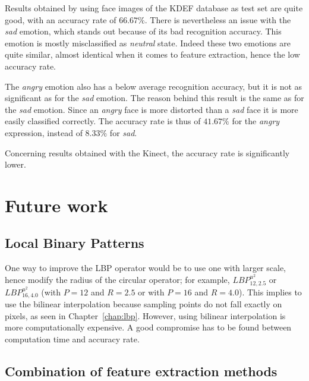 \noindent Results obtained by using face images of the KDEF database as test set are quite good, with an accuracy rate of $ 66.67\% $. There is nevertheless an issue with the \textit{sad} emotion, which stands out because of its bad recognition accuracy. This emotion is mostly misclassified as \textit{neutral} state. Indeed these two emotions are quite similar, almost identical when it comes to feature extraction, hence the low accuracy rate.
\newline

\noindent The \textit{angry} emotion also has a below average recognition accuracy, but it is not as significant as for the \textit{sad} emotion. The reason behind this result is the same as for the \textit{sad} emotion. Since an \textit{angry} face is more distorted than a \textit{sad} face it is more easily classified correctly. The accuracy rate is thus of $ 41.67\% $ for the \textit{angry} expression,  instead of $ 8.33\% $ for \textit{sad}.
\newline

\noindent Concerning results obtained with the Kinect, the accuracy rate is significantly lower.
\newline

\section{Future work}

\subsection{Local Binary Patterns}

\vspace{\baselineskip}
\noindent One way to improve the LBP operator would be to use one with larger scale, hence modify the radius of the circular operator; for example, $ LBP_{12,2.5}^{u^2} $ or $ LBP_{16,4.0}^{u^2} $ (with $ P = 12 $ and $ R = 2.5 $ or with $ P = 16 $ and $ R = 4.0 $). This implies to use the bilinear interpolation because sampling points do not fall exactly on pixels, as seen in Chapter~\ref{chap:lbp}. However, using bilinear interpolation is more computationally expensive. A good compromise has to be found between computation time and accuracy rate.
\newline

\subsection{Combination of feature extraction methods}

